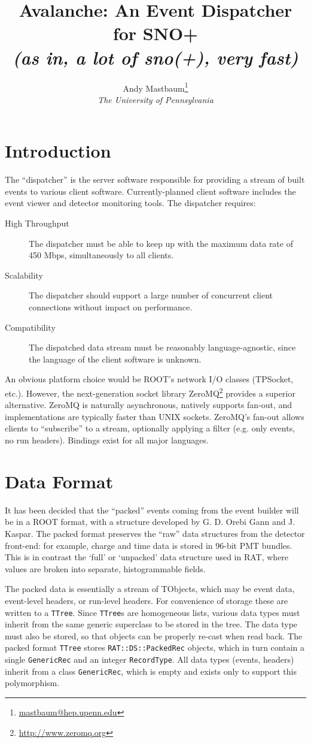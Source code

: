 \documentclass{article}
\title{Avalanche: An Event Dispatcher for SNO+\\{\it \small (as in, a lot of sno(+), very fast)}}
\author{Andy Mastbaum\footnote{\href{mailto:mastbaum@hep.upenn.edu}{mastbaum@hep.upenn.edu}}\\\small{\it The University of Pennsylvania}}
\begin{document}
\maketitle
\section{Introduction}
The ``dispatcher'' is the server software responsible for providing a stream of built events to various client software. Currently-planned client software includes the event viewer and detector monitoring tools. The dispatcher requires:

\begin{description}
\item[High Throughput] The dispatcher must be able to keep up with the maximum data rate of 450 Mbps, simultaneously to all clients.
\item[Scalability] The dispatcher should support a large number of concurrent client connections without impact on performance.
\item[Compatibility] The dispatched data stream must be reasonably language-agnostic, since the language of the client software is unknown.
\end{description}

An obvious platform choice would be ROOT's network I/O classes (TPSocket, etc.). However, the next-generation socket library ZeroMQ\footnote{\href{http://www.zeromq.org}{http://www.zeromq.org}} provides a superior alternative. ZeroMQ is naturally asynchronous, natively supports fan-out, and implementations are typically faster than UNIX sockets. ZeroMQ's fan-out allows clients to ``subscribe'' to a stream, optionally applying a filter (e.g. only events, no run headers). Bindings exist for all major languages.

\section{Data Format}
It has been decided that the ``packed'' events coming from the event builder will be in a ROOT format, with a structure developed by G. D. Orebi Gann and J. Kaspar. The packed format preserves the ``raw'' data structures from the detector front-end: for example, charge and time data is stored in 96-bit PMT bundles. This is in contrast the `full' or `unpacked' data structure used in RAT, where values are broken into separate, histogrammable fields.

The packed data is essentially a stream of TObjects, which may be event data, event-level headers, or run-level headers. For convenience of storage these are written to a {\tt TTree}. Since {\tt TTree}s are homogeneous lists, various data types must inherit from the same generic superclass to be stored in the tree. The data type must also be stored, so that objects can be properly re-cast when read back. The packed format {\tt TTree} stores {\tt RAT::DS::PackedRec} objects, which in turn contain a single {\tt GenericRec} and an integer {\tt RecordType}. All data types (events, headers) inherit from a class {\tt GenericRec}, which is empty and exists only to support this polymorphism.
\end{document}
